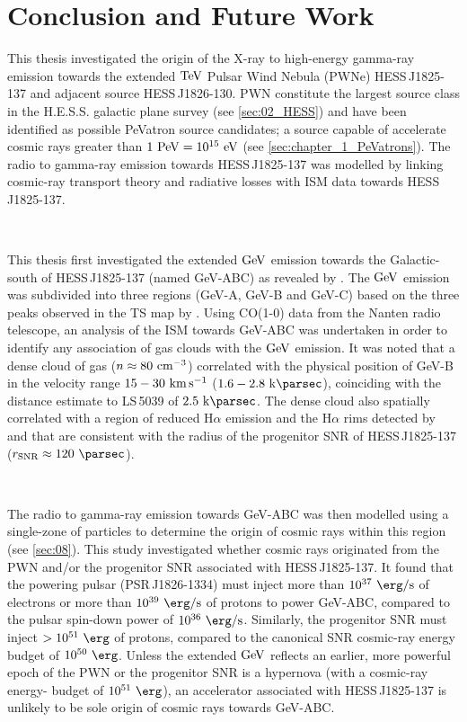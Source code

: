 \chapter{Conclusion and Future Work} \label{sec:10_summary}

This thesis investigated the origin of the X-ray to high-energy gamma-ray emission towards the extended $\TeV$ Pulsar Wind Nebula (PWNe) \mbox{HESS\,J1825-137} and adjacent source \mbox{HESS\,J1826-130}. PWN constitute the largest source class in the H.E.S.S. galactic plane survey (see \autoref{sec:02_HESS}) and have been identified as possible PeVatron source candidates; a source capable of accelerate cosmic rays greater than $1~\PeV=10^{15}~\eV$ (see \autoref{sec:chapter_1_PeVatrons}). The radio to gamma-ray emission towards \mbox{HESS\,J1825-137} was modelled by linking cosmic-ray transport theory and radiative losses with ISM data towards \mbox{HESS\,J1825-137}.
\par~\par
This thesis first investigated the extended $\si{\giga\electronvolt}$ emission towards the Galactic-south of \mbox{HESS\,J1825-137} (named GeV-ABC) as revealed by \cite{2019MNRAS.485.1001A}. The $\si{\giga\electronvolt}$ emission was subdivided into three regions (GeV-A, GeV-B and GeV-C) based on the three peaks observed in the TS map by \cite{2019MNRAS.485.1001A}. Using CO(1-0) data from the Nanten radio telescope, an analysis of the ISM towards GeV-ABC was undertaken in order to identify any association of gas clouds with the $\si{\giga\electronvolt}$ emission. It was noted that a dense cloud of gas ($n\approx 80~\si{\per\centi\meter\cubed}$) correlated with the physical position of GeV-B in the velocity range $15-30~\si{\kilo\meter\per\second}$ ($1.6-2.8~\kpc$), coinciding with the distance estimate to \mbox{LS\,5039} of $2.5~\kpc$. The dense cloud also spatially correlated with a region of reduced H$\alpha$ emission and the H$\alpha$ rims detected by \cite{2008MNRAS.390.1037S} and \cite{2016MNRAS.458.2813V} that are consistent with the radius of the progenitor SNR of \mbox{HESS\,J1825-137} ($r_\text{SNR}\approx 120~\pc$).
\par~\par
The radio to gamma-ray emission towards \mbox{GeV-ABC} was then modelled using a single-zone of particles to determine the origin of cosmic rays within this region (see \autoref{sec:08}). This study investigated whether cosmic rays originated from the PWN and/or the progenitor SNR associated with \mbox{HESS\,J1825-137}. It found that the powering pulsar (\mbox{PSR\,J1826-1334}) must inject more than {$10^{37}~\ergspersec$} of electrons or more than $10^{39}~\ergspersec$ of protons to power \mbox{GeV-ABC}, compared to the pulsar spin-down power of $10^{36}~\ergspersec$. Similarly, the progenitor SNR must inject $>10^{51}~\ergs$ of protons, compared to the canonical SNR cosmic-ray energy budget of $10^{50}~\ergs$. Unless the extended $\si{\giga\electronvolt}$ reflects an earlier, more powerful epoch of the PWN or the progenitor SNR is a hypernova (with a cosmic-ray energy- budget of $10^{51}~\ergs$), an accelerator associated with \mbox{HESS\,J1825-137} is unlikely to be sole origin of cosmic rays towards \mbox{GeV-ABC}.

